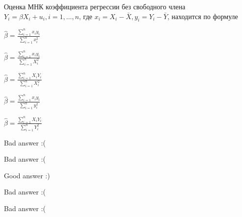 
\begin{question}
Оценка МНК коэффициента регрессии без свободного члена \(Y_i = \beta X_i + u_i, i = 1, \ldots, n\),
где \(x_i = X_i - \bar X, y_i = Y_i - \bar Y\), находится по формуле
\begin{answerlist}
  \item \(\hat \beta = \frac{\sum_{i=1}^n x_i y_i }{\sum_{i=1}^n x_i^2}\)
  \item \(\hat \beta = \frac{\sum_{i=1}^n x_i y_i }{\sum_{i=1}^n X_i^2}\)
  \item \(\hat \beta = \frac{\sum_{i=1}^n X_i Y_i }{\sum_{i=1}^n X_i^2}\)
  \item \(\hat \beta = \frac{\sum_{i=1}^n x_i y_i }{\sum_{i=1}^n y_i^2}\)
  \item \(\hat \beta = \frac{\sum_{i=1}^n X_i Y_i }{\sum_{i=1}^n Y_i^2}\)
\end{answerlist}
\end{question}

\begin{solution}
\begin{answerlist}
  \item Bad answer :(
  \item Bad answer :(
  \item Good answer :)
  \item Bad answer :(
  \item Bad answer :(
\end{answerlist}
\end{solution}

